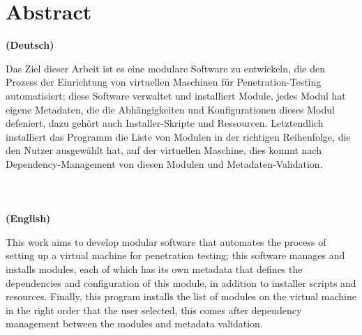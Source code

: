 \chapter*{Abstract}
\textbf{(Deutsch)}

Das Ziel dieser Arbeit ist es eine modulare Software zu entwickeln, die den Prozess der Einrichtung von virtuellen Maschinen für Penetration-Testing automatisiert; diese Software verwaltet und installiert Module, jedes Modul hat eigene Metadaten, die die Abhängigkeiten und Konfigurationen dieses Modul defeniert, dazu gehört auch Installer-Skripte und Ressourcen.
Letztendlich installiert das Programm die Liste von Modulen in der richtigen Reihenfolge, die den Nutzer ausgewählt hat, auf der virtuellen Maschine, dies kommt nach Dependency-Management von diesen Modulen und Metadaten-Validation.
\\
\\
\\
\\

\textbf{(English)}

This work aims to develop modular software that automates the process of setting up a virtual machine for penetration testing; this software manages and installs modules, each of which has its own metadata that defines the dependencies and configuration of this module, in addition to installer scripts and resources.
Finally, this program installs the list of modules on the virtual machine in the right order that the user selected, this comes after dependency management between the modules and metadata validation.
